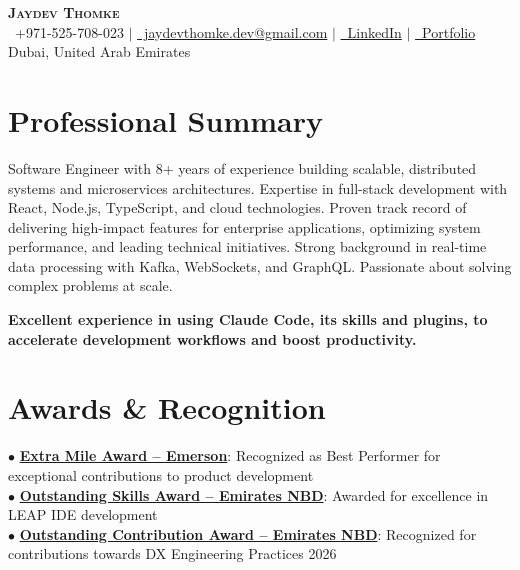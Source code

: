 \documentclass[letterpaper,12pt]{article}
\begin{document}
\begin{center}
    \textbf{\Huge \scshape Jaydev Thomke} \\ \vspace{2pt}
    \small \faPhone\ +971-525-708-023 $|$ 
    \href{mailto:jaydevthomke.dev@gmail.com}{\faEnvelope\ jaydevthomke.dev@gmail.com} $|$ 
    \href{https://linkedin.com/in/jaydev-thomke-730924136}{\faLinkedin\ LinkedIn} $|$
    \href{https://jaydev25.github.io/resume/}{\faGlobe\ Portfolio} \\
    \small Dubai, United Arab Emirates
\end{center}

\section{Professional Summary}
\small{Software Engineer with 8+ years of experience building scalable, distributed systems and microservices architectures. Expertise in full-stack development with React, Node.js, TypeScript, and cloud technologies. Proven track record of delivering high-impact features for enterprise applications, optimizing system performance, and leading technical initiatives. Strong background in real-time data processing with Kafka, WebSockets, and GraphQL. Passionate about solving complex problems at scale.}

\vspace{4pt}
\small{\textbf{Excellent experience in using Claude Code, its skills and plugins, to accelerate development workflows and boost productivity.}}

\section{Awards \& Recognition}
 \begin{itemize}[leftmargin=0.15in, label={}]
    \small{\item{
     $\bullet$ \textbf{\href{https://www.linkedin.com/posts/activity-7278264293890940929-Wyra/}{Extra Mile Award -- Emerson}}{: Recognized as Best Performer for exceptional contributions to product development} \\
     $\bullet$ \textbf{\href{https://www.linkedin.com/posts/activity-7378828158617157633-18Ze/}{Outstanding Skills Award -- Emirates NBD}}{: Awarded for excellence in LEAP IDE development} \\
     $\bullet$ \textbf{\href{https://www.linkedin.com/posts/activity-7446961085615726592-HPTA/}{Outstanding Contribution Award -- Emirates NBD}}{: Recognized for contributions towards DX Engineering Practices 2026} \\
    }}
 \end{itemize}
\end{document}
